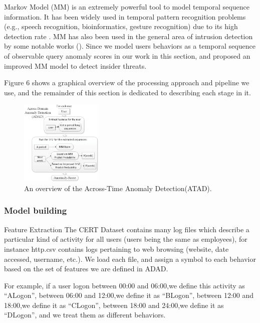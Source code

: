\documentclass[conference]{IEEEtran}
\begin{document}
Markov Model (MM)\cite{b45} is an extremely powerful
tool to model temporal sequence information. It has been
widely used in temporal pattern recognition problems (e.g.,
speech recognition, bioinformatics, gesture recognition) due
to its high detection rate \cite{b55}. MM has also been used
in the general area of intrusion detection by some notable
works (\cite{b54}). Since we model users behaviors as a
temporal sequence of observable query anomaly scores in
our work in this section, and proposed an improved MM model to detect insider threats.

Figure 6 shows a graphical overview of the processing approach and pipeline we use, and the remainder of this section is dedicated to describing each stage in it.
\begin{figure}[htb]
\centerline{\includegraphics[width = 0.35\textwidth]{figure/figure6.eps}}
\caption{An overview of the Across-Time Anomaly Detection(ATAD).}
\label{fig}
\end{figure}
\subsubsection{Model building}
\iffalse
Feature Extraction
The CERT Dataset contains many log files which describe a particular kind of activity for all users (users being the same as employees), for instance http.csv contains logs pertaining to web browsing (website, date accessed, username, etc.). We load each file, and assign a symbol to each behavior based on the set of features we are defined in ADAD. 

For example, if a user logon between 00:00 and 06:00,we define this activity as “ALogon”, between 06:00 and 12:00,we define it as “BLogon”, between 12:00 and 18:00,we define it as “CLogon”, between 18:00 and 24:00,we define it as “DLogon”, and we treat them as different behaviors. 
\end{document}
